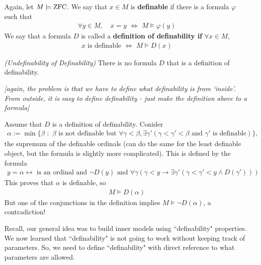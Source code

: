 \documentclass[12pt,a4paper]{article}
\newenvironment{proof}
{\begin{changemargin}{0.5cm}{0.5cm} 
	}%
	{\end{changemargin}
}
\newenvironment{p}
{\begin{proof} 
	}%
	{\end{proof}
}
\begin{document}
 Again, let $M\models \text{ZFC}$. We say that $x\in M$ is \textbf{definable} if there is a formula $\varphi$ such that 
\begin{align*}
\forall y\in M, \quad x=y \,\, \Leftrightarrow \,\, M\models \varphi(y)
\end{align*}
We say that a formula $D$ is called a \textbf{definition of definability if} $\forall x\in M$,
\begin{align*}
x \text{ is definable} \,\, \Leftrightarrow \,\, M \models D(x)
\end{align*}
\s

\thm \emph{(Undefinability of Definability)} There is no formula $D$ that is a definition of definability.

\quad \emph{[again, the problem is that we have to define what definability is from `inside'. From outside, it is easy to define definability - just make the definition above to a formula]}
\begin{p}
\pf Assume that $D$ is a definition of definability. Conider
\begin{align*}
\alpha := \min \{ \beta\,\, : \,\, \beta \text{ is not definable but } \forall \gamma < \beta, \exists \gamma'(\gamma < \gamma'< \beta \text{ and } \gamma' \text{ is definable}) \},
\end{align*}
the supremum of the definable ordinals (can do the same for the least definable object, but the formula is slightly more complicated). This is defined by the formula
\begin{align*}
y=\alpha \leftrightarrow  \text{ is an ordinal and } \neg D(y) \text{ and } \forall \gamma (\gamma < y \rightarrow \exists \gamma' (\gamma < \gamma' < y \wedge D(\gamma'))) 
\end{align*}
This proves that $\alpha$ is definable, so
\begin{align*}
M \models D(\alpha)
\end{align*}
But one of the conjunctions in the definition implies $M\models \neg D(\alpha)$, a contradiction!

\eop
\end{p}
\s

Recall, our general idea was to build inner models using ``definability" properties. We now learned that ``definability" is not going to work without keeping track of parameters. So, we need to define ``definability" with direct reference to what parameters are allowed.
\s
\end{document}
